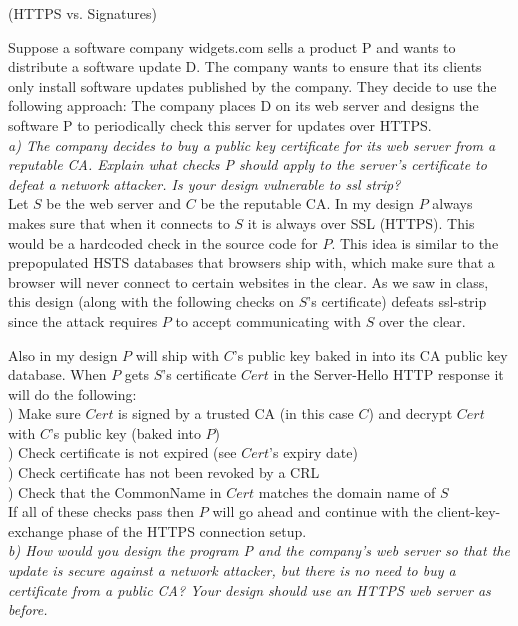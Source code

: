 \begin{prob}  (HTTPS vs. Signatures)
\end{prob}

\noindent Suppose a software company widgets.com sells a product P and wants to distribute a software update D. The company wants to ensure that its clients only install software updates published by the company. They decide to use the following approach: The company places D on its web server and designs the software P to periodically check this server for updates over HTTPS.\\

\noindent \textit{a) The company decides to buy a public key certificate for its web server from a reputable CA. Explain what checks P should apply to the server's certificate to defeat a network attacker. Is your design vulnerable to ssl strip?}\\

Let $S$ be the web server and $C$ be the reputable CA. In my design $P$ always makes sure that when it connects to $S$ it is always over SSL (HTTPS). This would be a hardcoded check in the source code for $P$. This idea is similar to the prepopulated HSTS databases that browsers ship with, which make sure that a browser will never connect to certain websites in the clear. As we saw in class, this design (along with the following checks on $S$'s certificate) defeats ssl-strip since the attack requires $P$ to accept communicating with $S$ over the clear. 

Also in my design $P$ will ship with $C$'s public key baked in into its CA public key database. When $P$ gets $S$'s certificate $Cert$ in the Server-Hello HTTP response it will do the following: \\
) Make sure $Cert$ is signed by a trusted CA (in this case $C$) and decrypt $Cert$ with $C$'s public key (baked into $P$)\\
) Check certificate is not expired (see $Cert$'s expiry date)\\
) Check certificate has not been revoked by a CRL\\
) Check that the CommonName in $Cert$ matches the domain name of $S$\\
If all of these checks pass then $P$ will go ahead and continue with the client-key-exchange phase of the HTTPS connection setup.\\

\noindent \textit{b) How would you design the program P and the company's web server so that the update is secure against a network attacker, but there is no need to buy a certificate from a public CA? Your design should use an HTTPS web server as before.}\\

